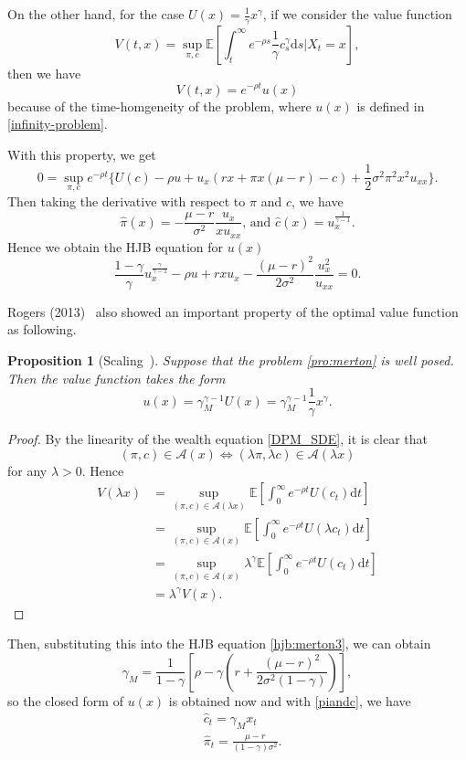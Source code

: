 \documentclass[a4paper]{article}
\newtheorem{proposition}[theorem]{Proposition}
\theoremstyle{definition}
\numberwithin{equation}{section}
\begin{document}
On the other hand, for the case $U(x)=\frac{1}{\gamma}x^\gamma$, if we consider the value function
\begin{equation}\label{pro:merton}
V(t,x)=\sup_{\pi,c}\mathbb E[\int^\infty_te^{-\rho s}\frac{1}{\gamma}c_s^\gamma\mathrm ds\lvert X_t=x],
\end{equation}
then we have
$$V(t,x)=e^{-\rho t}u(x)$$
because of the time-homgeneity of the problem, where $u(x)$ is defined in \eqref{infinity-problem}.

With this property, we get
\begin{equation}\label{hjb:merton2}
0=\sup_{\pi,c}e^{-\rho t}\{U(c)-\rho u+u_x(rx+\pi x(\mu-r)-c)+\frac{1}{2}\sigma^2\pi^2x^2u_{xx}\}.
\end{equation}
Then taking the derivative with respect to $\pi$ and $c$, we have
\begin{equation}\label{piandc}
\hat\pi(x)=-\frac{\mu-r}{\sigma^2}\frac{u_x}{xu_{xx}}\text{, and }
\hat c(x)=u_x^\frac{1}{\gamma-1}.
\end{equation}
Hence we obtain the HJB equation for $u(x)$
\begin{equation}\label{hjb:merton3}
\frac{1-\gamma}{\gamma}u_x^\frac{\gamma}{\gamma-1}-\rho u+rxu_x-\frac{(\mu-r)^2}{2\sigma^2}\frac{u_x^2}{u_{xx}}=0.
\end{equation}

Rogers (2013)~\cite{book3} also showed an important property of the optimal value function as following.
\begin{proposition}[Scaling~\cite{book3}]
Suppose that the problem \eqref{pro:merton} is well posed. Then the value function takes the form
$$u(x)=\gamma_M^{\gamma-1}U(x)=\gamma_M^{\gamma-1}\frac{1}{\gamma}x^\gamma.$$
\end{proposition}
\begin{proof}
By the linearity of the wealth equation \eqref{DPM_SDE}, it is clear that
$$(\pi,c)\in\mathcal A(x)\Leftrightarrow(\lambda\pi,\lambda c)\in\mathcal A(\lambda x)$$
for any $\lambda>0$. Hence
\begin{equation}
\begin{aligned}
V(\lambda x)&=\sup_{(\pi,c)\in\mathcal A(\lambda x)}\mathbb E[\int^\infty_0e^{-\rho t}U(c_t)\mathrm dt]\\
&=\sup_{(\pi,c)\in\mathcal A(x)}\mathbb E[\int^\infty_0e^{-\rho t}U(\lambda c_t)\mathrm dt]\\
&=\sup_{(\pi,c)\in\mathcal A(x)}\lambda^\gamma\mathbb E[\int^\infty_0e^{-\rho t}U(c_t)\mathrm dt]\\
&=\lambda^\gamma V(x).
\end{aligned}
\end{equation}
\end{proof}
Then, substituting this into the HJB equation \eqref{hjb:merton3}, we can obtain
$$\gamma_M=\frac{1}{1-\gamma}[\rho-\gamma(r+\frac{(\mu-r)^2}{2\sigma^2(1-\gamma)})],$$
so the closed form of $u(x)$ is obtained now and with \eqref{piandc}, we have
\begin{equation}
\begin{aligned}
&\hat c_t=\gamma_Mx_t\\
&\hat\pi_t=\frac{\mu-r}{(1-\gamma)\sigma^2}.
\end{aligned}
\end{equation}
\end{document}
